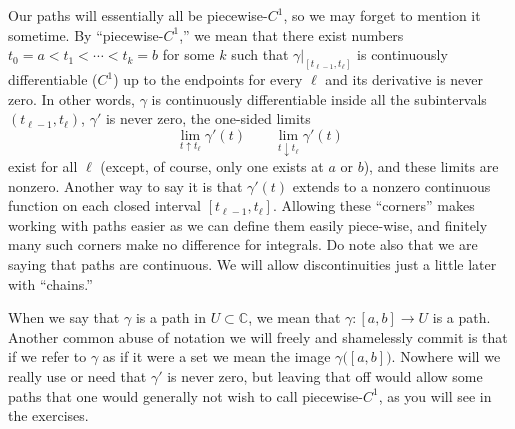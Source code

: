 \documentclass[12pt,openany]{book}
\newcommand{\C}{{\mathbb{C}}}
\newcommand{\myquote}[1]{``#1''}
\theoremstyle{plain}
\theoremstyle{remark}
\theoremstyle{definition}
\theoremstyle{exercise}
\theoremstyle{example}
\begin{document}
Our paths will essentially all be piecewise-$C^1$,
so we may forget to mention it sometime.
By \myquote{piecewise-$C^1$,}
we mean that there exist numbers $t_0 = a < t_1 < \cdots
< t_k = b$ for some $k$ such that $\gamma|_{[t_{\ell-1},t_\ell]}$ is
continuously differentiable ($C^1$) up to
the endpoints for every $\ell$ and its derivative is never zero.
In other words, $\gamma$ is continuously differentiable inside all the
subintervals $(t_{\ell-1},t_\ell)$, $\gamma'$ is never zero, the one-sided limits
\begin{equation*}
\lim_{t \uparrow t_\ell} \gamma'(t) \qquad
\lim_{t \downarrow t_\ell} \gamma'(t)
\end{equation*}
exist for all $\ell$ (except, of course, only one exists at $a$ or $b$),
and these limits are nonzero.
Another way to say it is that $\gamma'(t)$ extends to a nonzero
continuous function on each closed interval $[t_{\ell-1},t_{\ell}]$.
Allowing these \myquote{corners} makes working with paths easier
as we can define them easily piece-wise, and finitely many such corners
make no difference for integrals.
Do note also that we are saying that paths are continuous.  We will allow
discontinuities just a little later with \myquote{chains.}

When we say that $\gamma$ is a path in $U \subset \C$,
we mean that
$\gamma \colon [a,b] \to U$ is a path.  Another common abuse of notation we
will freely and shamelessly commit is that if we refer to $\gamma$
as if it were a set we mean the image $\gamma\bigl([a,b]\bigr)$.
Nowhere will we really use or need that $\gamma'$ is never zero,
but leaving that off would allow some paths that one would generally not
wish to call piecewise-$C^1$,
as you will see in the exercises.
\end{document}
